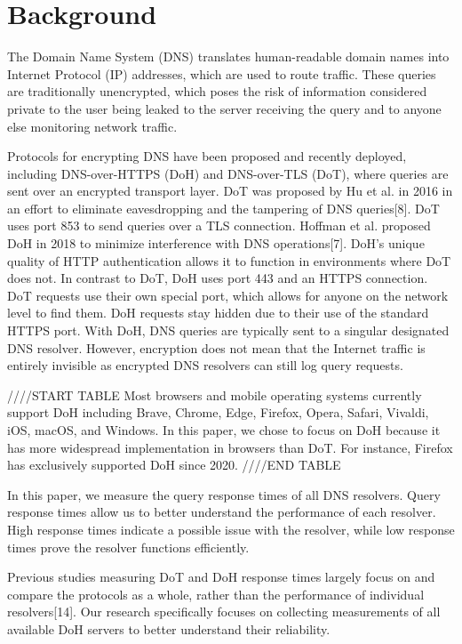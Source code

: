 \section{Background}\label{sec:back}

The Domain Name System (DNS) translates human-readable domain names into Internet Protocol (IP) addresses, which are used to route traffic.
These queries are traditionally unencrypted, which poses the risk of information considered private to the user being leaked to the server receiving the query and to anyone else monitoring network traffic. 

Protocols for encrypting DNS have been proposed and recently deployed, including DNS-over-HTTPS (DoH) and DNS-over-TLS (DoT), where queries are sent over an encrypted transport layer.
DoT was proposed by Hu et al. in 2016 in an effort to eliminate eavesdropping and the tampering of DNS queries[8].
DoT uses port 853 to send queries over a TLS connection.
Hoffman et al. proposed DoH in 2018 to minimize interference with DNS operations[7].
DoH's unique quality of HTTP authentication allows it to function in environments where DoT does not.
In contrast to DoT, DoH uses port 443 and an HTTPS connection.
DoT requests use their own special port, which allows for anyone on the network level to find them.
DoH requests stay hidden due to their use of the standard HTTPS port.
With DoH, DNS queries are typically sent to a singular designated DNS resolver.
However, encryption does not mean that the Internet traffic is entirely invisible as encrypted DNS resolvers can still log query requests.

////START TABLE
Most browsers and mobile operating systems currently support DoH including Brave, Chrome, Edge, Firefox, Opera, Safari, Vivaldi, iOS, macOS, and Windows.
In this paper, we chose to focus on DoH because it has more widespread implementation in browsers than DoT.
For instance, Firefox has exclusively supported DoH since 2020.
////END TABLE

In this paper, we measure the query response times of all DNS resolvers.
Query response times allow us to better understand the performance of each resolver.
High response times indicate a possible issue with the resolver, while low response times prove the resolver functions efficiently.

Previous studies measuring DoT and DoH response times largely focus on and compare the protocols as a whole, rather than the performance of individual resolvers[14].
Our research specifically focuses on collecting measurements of all available DoH servers to better understand their reliability.
